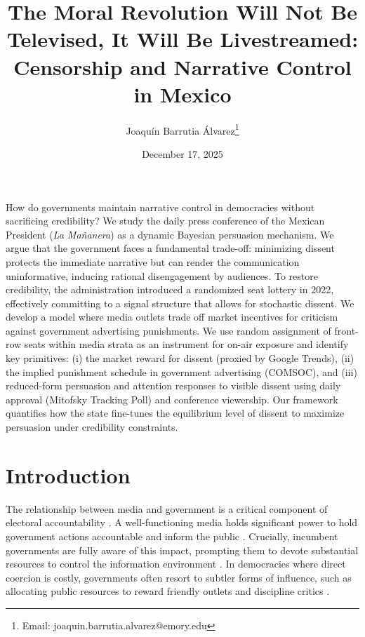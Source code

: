\documentclass[12pt]{article}
\title{The Moral Revolution Will Not Be Televised, It Will Be Livestreamed:\\ Censorship and Narrative Control in Mexico}
\author{Joaquín Barrutia Álvarez\thanks{ Email: joaquin.barrutia.alvarez@emory.edu}}
\date{December 17, 2025}
\renewenvironment{abstract}
 {\small
  \begin{center}
  \bfseries \abstractname\vspace{-.5em}\vspace{0pt}
  \end{center}
  \list{}{
    \setlength{\leftmargin}{35mm}
    \setlength{\rightmargin}{\leftmargin}%
  }
  \item\relax}
 {\endlist}
\begin{document}
\maketitle

\begin{abstract}
\noindent
How do governments maintain narrative control in democracies without sacrificing credibility? We study the daily press conference of the Mexican President (\textit{La Mañanera}) as a dynamic Bayesian persuasion mechanism. We argue that the government faces a fundamental trade-off: minimizing dissent protects the immediate narrative but can render the communication uninformative, inducing rational disengagement by audiences. To restore credibility, the administration introduced a randomized seat lottery in 2022, effectively committing to a signal structure that allows for stochastic dissent. We develop a model where media outlets trade off market incentives for criticism against government advertising punishments. We use random assignment of front-row seats within media strata as an instrument for on-air exposure and identify key primitives: (i) the market reward for dissent (proxied by Google Trends), (ii) the implied punishment schedule in government advertising (COMSOC), and (iii) reduced-form persuasion and attention responses to visible dissent using daily approval (Mitofsky Tracking Poll) and conference viewership. Our framework quantifies how the state fine-tunes the equilibrium level of dissent to maximize persuasion under credibility constraints.
\end{abstract}

\newpage

\section{Introduction}

The relationship between media and government is a critical component of electoral accountability \citep{Audits-Ferraz-QJE, PolInfo-Enriquez-JEEA, Marshall}. A well-functioning media holds significant power to hold government actions accountable and inform the public \citep{Stromberg-MediaCoverage}. Crucially, incumbent governments are fully aware of this impact, prompting them to devote substantial resources to control the information environment \citep{Autocracy-Guriev-JPE}. In democracies where direct coercion is costly, governments often resort to subtler forms of influence, such as allocating public resources to reward friendly outlets and discipline critics \citep{ArgCorr-DiTella-AEJAE, MediaCaptures-Zeidl-Econometrica}.
\end{document}
